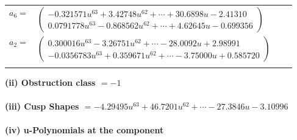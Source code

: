 \documentclass[1p]{elsarticle_modified}
\theoremstyle{definition}
\begin{document}
\begin{tabular}{m{7pt} m{180pt} m{7pt} m{180pt} }
\flushright $a_{6}=$&$\begin{pmatrix}-0.321571 u^{63}+3.42748 u^{62}+\cdots+30.6898 u-2.41310\\0.0791778 u^{63}-0.868562 u^{62}+\cdots+4.62645 u-0.699356\end{pmatrix}$ \\
\flushright $a_{2}=$&$\begin{pmatrix}0.300016 u^{63}-3.26751 u^{62}+\cdots-28.0092 u+2.98991\\-0.0356783 u^{63}+0.359671 u^{62}+\cdots-3.75000 u+0.585720\end{pmatrix}$\\&\end{tabular}
\flushleft \textbf{(ii) Obstruction class $= -1$}\\~\\
\flushleft \textbf{(iii) Cusp Shapes $= -4.29495 u^{63}+46.7201 u^{62}+\cdots-27.3846 u-3.10996$}\\~\\
\newpage\renewcommand{\arraystretch}{1}
\flushleft \textbf{(iv) u-Polynomials at the component}\newline \\
\end{document}
